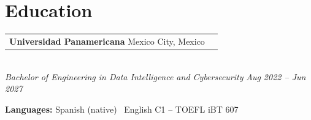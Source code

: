 \documentclass[10pt, letterpaper]{article}
\makeatletter
\newcommand{\entry}[2]{%
  \noindent\begin{tabular*}{\textwidth}{@{}l@{\extracolsep{\fill}}r@{}}
    #1 & #2
  \end{tabular*}}
\makeatother
\begin{document}
\section{Education}

\entry{\textbf{Universidad Panamericana} \quad Mexico City, Mexico}{}\\
\textit{Bachelor of Engineering in Data Intelligence and Cybersecurity}
\hfill \textit{Aug 2022 -- Jun 2027}

\medskip

\noindent\textbf{Languages:} Spanish (native) \textbullet\ English C1 -- TOEFL iBT 607
\end{document}
